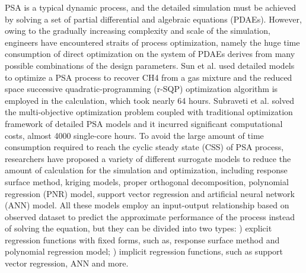 \documentclass[preprint,12pt]{elsarticle}
\begin{document}
	PSA is a typical dynamic process, and the detailed simulation must be achieved by solving a set of partial differential and algebraic equations (PDAEs)\cite{RN23,RN24}. However, owing to the gradually increasing complexity and scale of the simulation, engineers have encountered straits of process optimization, namely the huge time consumption of direct optimization on the system of PDAEs derives from many possible combinations of the design parameters\cite{RN25,RN26,RN27}. Sun et al. used detailed models to optimize a PSA process to recover CH4 from a gas mixture and the reduced space successive quadratic-programming (r-SQP) optimization algorithm is employed in the calculation, which took nearly 64 hours\cite{RN28}. Subraveti et al. solved the multi-objective optimization problem coupled with traditional optimization framework of detailed PSA models and it incurred significant computational costs, almost 4000 single-core hours\cite{RN29}. To avoid the large amount of time consumption required to reach the cyclic steady state (CSS) of PSA process, researchers have proposed a variety of different surrogate models to reduce the amount of calculation for the simulation and optimization, including response surface method, kriging models\cite{RN30,RN31,RN32}, proper orthogonal decomposition\cite{RN33}, polynomial regression (PNR) model\cite{RN19,RN25},  support vector regression\cite{RN25,RN34} and artificial neural network (ANN) model\cite{RN34,RN35}. All these models employ an input-output relationship based on observed dataset to predict the approximate performance of the process instead of solving the equation, but they can be divided into two types: \uppercase\expandafter{}) explicit regression functions with fixed forms, such as, response surface method and polynomial regression model; \uppercase\expandafter{}) implicit regression functions, such as support vector regression, ANN and more\cite{RN36}.
	
\end{document}
